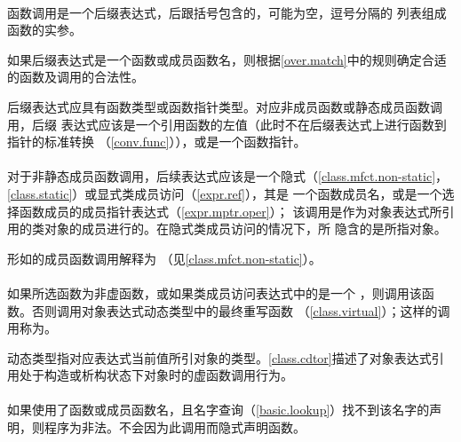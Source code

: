\paragraph{} %
函数调用是一个后缀表达式，后跟括号包含的，可能为空，逗号分隔的
列表组成函数的实参。

\begin{note}
  如果后缀表达式是一个函数或成员函数名，则根据\ref{over.match}中的规则确定合适
  的函数及调用的合法性。
\end{note}

后缀表达式应具有函数类型或函数指针类型。对应非成员函数或静态成员函数调用，后缀
表达式应该是一个引用函数的左值（此时不在后缀表达式上进行函数到指针的标准转换
（\ref{conv.func}）），或是一个函数指针。

\paragraph{} %
对于非静态成员函数调用，后续表达式应该是一个隐式（\ref{class.mfct.non-static}，
\ref{class.static}）或显式类成员访问（\ref{expr.ref}），其是
一个函数成员名，或是一个选择函数成员的成员指针表达式（\ref{expr.mptr.oper}）；
该调用是作为对象表达式所引用的类对象的成员进行的。在隐式类成员访问的情况下，所
隐含的是所指对象。

\begin{note}
  形如的成员函数调用解释为
  （见\ref{class.mfct.non-static}）。
\end{note}

\paragraph{} %
如果所选函数为非虚函数，或如果类成员访问表达式中的是一个
，则调用该函数。否则调用对象表达式动态类型中的最终重写函数
（\ref{class.virtual}）；这样的调用称为。

\begin{note}
  动态类型指对应表达式当前值所引对象的类型。\ref{class.cdtor}描述了对象表达式引
  用处于构造或析构状态下对象时的虚函数调用行为。
\end{note}

\paragraph{} %
\begin{note}
  如果使用了函数或成员函数名，且名字查询（\ref{basic.lookup}）找不到该名字的声
  明，则程序为非法。不会因为此调用而隐式声明函数。
\end{note}


